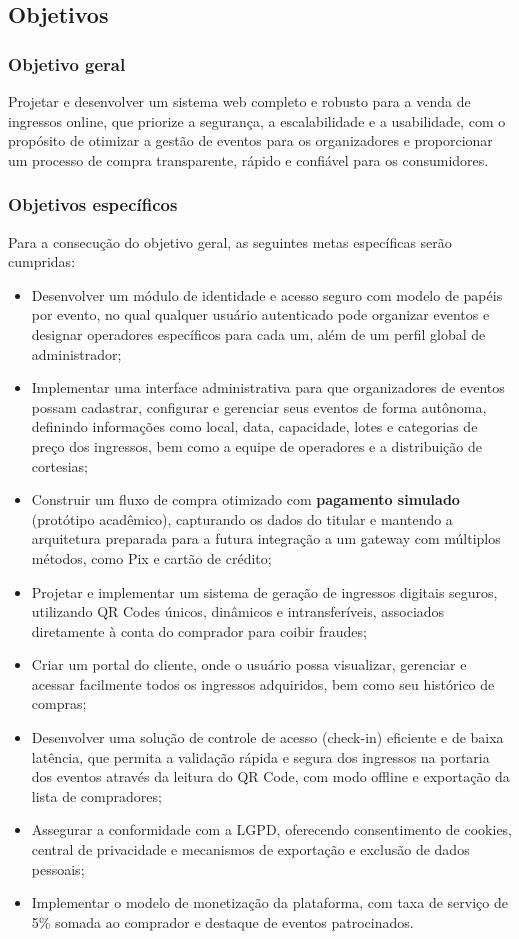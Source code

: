 \subsection{Objetivos}

\subsubsection{Objetivo geral}

Projetar e desenvolver um sistema web completo e robusto para a venda de ingressos online, que priorize a segurança, a escalabilidade e a usabilidade, com o propósito de otimizar a gestão de eventos para os organizadores e proporcionar um processo de compra transparente, rápido e confiável para os consumidores.

\subsubsection{Objetivos específicos}

Para a consecução do objetivo geral, as seguintes metas específicas serão cumpridas:
\begin{itemize}
    \item Desenvolver um módulo de identidade e acesso seguro com modelo de papéis por evento, no qual qualquer usuário autenticado pode organizar eventos e designar operadores específicos para cada um, além de um perfil global de administrador;
    \item Implementar uma interface administrativa para que organizadores de eventos possam cadastrar, configurar e gerenciar seus eventos de forma autônoma, definindo informações como local, data, capacidade, lotes e categorias de preço dos ingressos, bem como a equipe de operadores e a distribuição de cortesias;
    \item Construir um fluxo de compra otimizado com \textbf{pagamento simulado} (protótipo acadêmico), capturando os dados do titular e mantendo a arquitetura preparada para a futura integração a um gateway com múltiplos métodos, como Pix e cartão de crédito;
    \item Projetar e implementar um sistema de geração de ingressos digitais seguros, utilizando QR Codes únicos, dinâmicos e intransferíveis, associados diretamente à conta do comprador para coibir fraudes;
    \item Criar um portal do cliente, onde o usuário possa visualizar, gerenciar e acessar facilmente todos os ingressos adquiridos, bem como seu histórico de compras;
    \item Desenvolver uma solução de controle de acesso (check-in) eficiente e de baixa latência, que permita a validação rápida e segura dos ingressos na portaria dos eventos através da leitura do QR Code, com modo offline e exportação da lista de compradores;
    \item Assegurar a conformidade com a LGPD, oferecendo consentimento de cookies, central de privacidade e mecanismos de exportação e exclusão de dados pessoais;
    \item Implementar o modelo de monetização da plataforma, com taxa de serviço de 5\% somada ao comprador e destaque de eventos patrocinados.
\end{itemize}

